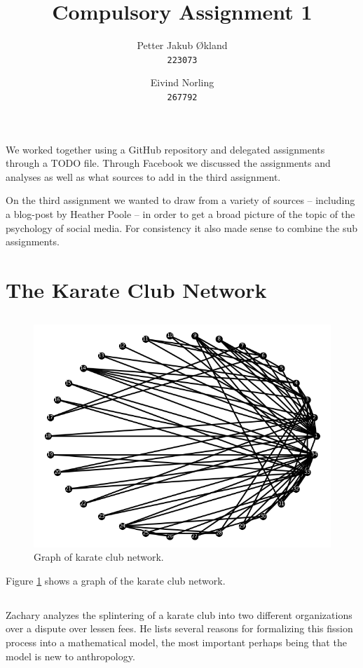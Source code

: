 \documentclass[11pt]{article}
\title{ Compulsory Assignment 1}
\author{
  Petter Jakub Økland\\
  \texttt{223073}
  \and
  Eivind Norling\\
  \texttt{267792}
}
\begin{document}
\maketitle

We worked together using a GitHub repository\cite{git} and delegated assignments through
a TODO file. Through Facebook we discussed the assignments and analyses as well as what
sources to add in the third assignment.

On the third assignment we wanted to draw from a variety of sources -- including a
blog-post by Heather Poole -- in order to get a broad picture of the topic of the psychology of
social media. For consistency it also made sense to combine the sub assignments.

\section{The Karate Club Network}
\subsection{}
\begin{figure}
  \includegraphics[width=\linewidth]{Figure_1.png}
  \caption{Graph of karate club network.}
  \label{fig:graph model}
\end{figure}

Figure \ref{fig:graph model} shows a graph of the karate club network.

\subsection{}
Zachary\cite{Zachary} analyzes the splintering of a karate club into two different organizations
over a dispute over lessen fees. He lists several reasons for formalizing this fission
process into a mathematical model, the most important perhaps being that the model is
new to anthropology.
\end{document}
